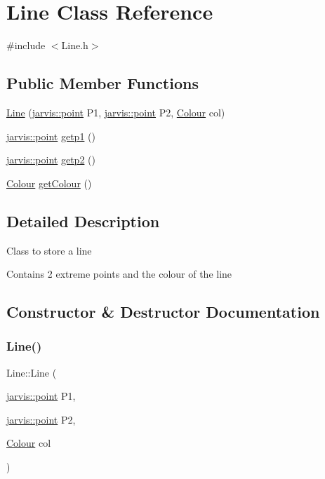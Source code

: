 \hypertarget{classLine}{}\section{Line Class Reference}
\label{classLine}


{\ttfamily \#include $<$Line.\+h$>$}

\subsection*{Public Member Functions}
\begin{DoxyCompactItemize}
\item 
\hyperlink{classLine_ac2d3a7ddf93e0bfb32a730cac1db7248}{Line} (\hyperlink{structjarvis_1_1point}{jarvis\+::point} P1, \hyperlink{structjarvis_1_1point}{jarvis\+::point} P2, \hyperlink{classColour}{Colour} col)
\item 
\hyperlink{structjarvis_1_1point}{jarvis\+::point} \hyperlink{classLine_adc485a6e95171ffbd436135e7ac0432d}{getp1} ()
\item 
\hyperlink{structjarvis_1_1point}{jarvis\+::point} \hyperlink{classLine_a38b77d72e009cad23e1c58821b6eb666}{getp2} ()
\item 
\hyperlink{classColour}{Colour} \hyperlink{classLine_a6cfda277058464af15578d64f37bec51}{get\+Colour} ()
\end{DoxyCompactItemize}


\subsection{Detailed Description}
Class to store a line

Contains 2 extreme points and the colour of the line 

\subsection{Constructor \& Destructor Documentation}
\mbox{\label{classLine_ac2d3a7ddf93e0bfb32a730cac1db7248}} 
\subsubsection{\texorpdfstring{Line()}{Line()}}
{\footnotesize\ttfamily Line\+::\+Line (\begin{DoxyParamCaption}\item[{\hyperlink{structjarvis_1_1point}{jarvis\+::point}}]{P1,  }\item[{\hyperlink{structjarvis_1_1point}{jarvis\+::point}}]{P2,  }\item[{\hyperlink{classColour}{Colour}}]{col }\end{DoxyParamCaption})}

